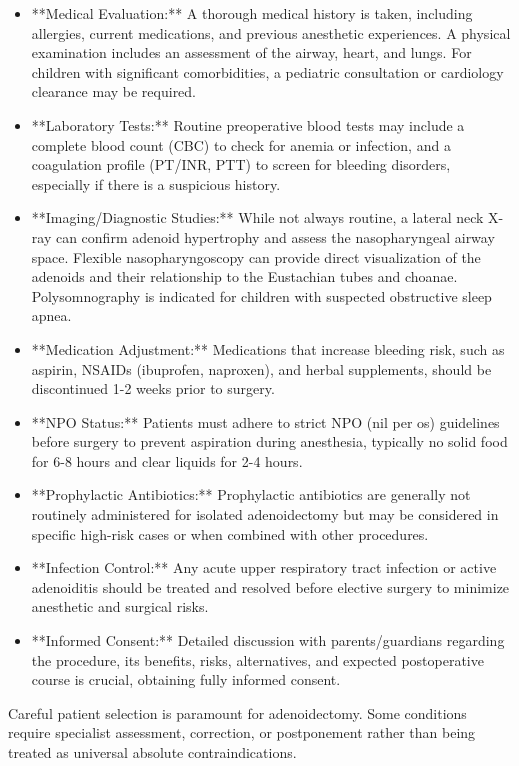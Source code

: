 \begin{itemize}
  \item **Medical Evaluation:** A thorough medical history is taken, including allergies, current medications, and previous anesthetic experiences. A physical examination includes an assessment of the airway, heart, and lungs. For children with significant comorbidities, a pediatric consultation or cardiology clearance may be required.
  \item **Laboratory Tests:** Routine preoperative blood tests may include a complete blood count (CBC) to check for anemia or infection, and a coagulation profile (PT/INR, PTT) to screen for bleeding disorders, especially if there is a suspicious history.
  \item **Imaging/Diagnostic Studies:** While not always routine, a lateral neck X-ray can confirm adenoid hypertrophy and assess the nasopharyngeal airway space. Flexible nasopharyngoscopy can provide direct visualization of the adenoids and their relationship to the Eustachian tubes and choanae. Polysomnography is indicated for children with suspected obstructive sleep apnea.
  \item **Medication Adjustment:** Medications that increase bleeding risk, such as aspirin, NSAIDs (ibuprofen, naproxen), and herbal supplements, should be discontinued 1-2 weeks prior to surgery.
  \item **NPO Status:** Patients must adhere to strict NPO (nil per os) guidelines before surgery to prevent aspiration during anesthesia, typically no solid food for 6-8 hours and clear liquids for 2-4 hours.
  \item **Prophylactic Antibiotics:** Prophylactic antibiotics are generally not routinely administered for isolated adenoidectomy but may be considered in specific high-risk cases or when combined with other procedures.
  \item **Infection Control:** Any acute upper respiratory tract infection or active adenoiditis should be treated and resolved before elective surgery to minimize anesthetic and surgical risks.
  \item **Informed Consent:** Detailed discussion with parents/guardians regarding the procedure, its benefits, risks, alternatives, and expected postoperative course is crucial, obtaining fully informed consent.
\end{itemize}

Careful patient selection is paramount for adenoidectomy. Some conditions require specialist assessment, correction, or postponement rather than being treated as universal absolute contraindications.

